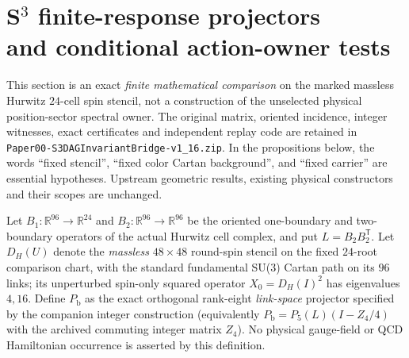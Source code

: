 \documentclass[12pt,a4paper]{article}
\begin{document}
\section[S$^3$ finite-response projectors and conditional action-owner tests]{S$^3$ finite-response projectors\\and conditional action-owner tests}
\label{p13:sec:s3-finite-response-v159}

This section is an exact \emph{finite mathematical comparison} on the
marked massless Hurwitz $24$-cell spin stencil, not a construction of the
unselected physical position-sector spectral owner.  The original
matrix, oriented incidence, integer witnesses, exact certificates and
independent replay code are retained in
\texttt{Paper00-S3DAGInvariantBridge-v1\_16.zip}.  In the propositions
below, the words ``fixed stencil'', ``fixed color Cartan background'',
and ``fixed carrier'' are essential hypotheses.  Upstream geometric
results, existing physical constructors and their scopes are unchanged.

\begin{definition}
\label{p13:def:s3-comparison-curvature-v159}
Let $B_1:\mathbb R^{96}\to\mathbb R^{24}$ and
$B_2:\mathbb R^{96}\to\mathbb R^{96}$ be the oriented
one-boundary and two-boundary operators of the actual Hurwitz cell
complex, and put $L=B_2B_2^\mathsf T$.
Let $D_H(U)$ denote the \emph{massless} $48\times48$ round-spin
stencil on the fixed $24$-root comparison chart, with the standard
fundamental SU(3) Cartan path on its $96$ links; its unperturbed
spin-only squared operator $X_0=D_H(I)^2$ has eigenvalues $4,16$.
Define $P_{\mathrm b}$ as the exact orthogonal rank-eight
\emph{link-space} projector specified by the companion integer
construction (equivalently
$P_{\mathrm b}=P_5(L)(I-Z_4/4)$ with the archived commuting
integer matrix $Z_4$).  No physical gauge-field or QCD Hamiltonian
occurrence is asserted by this definition.
\end{definition}
\end{document}
